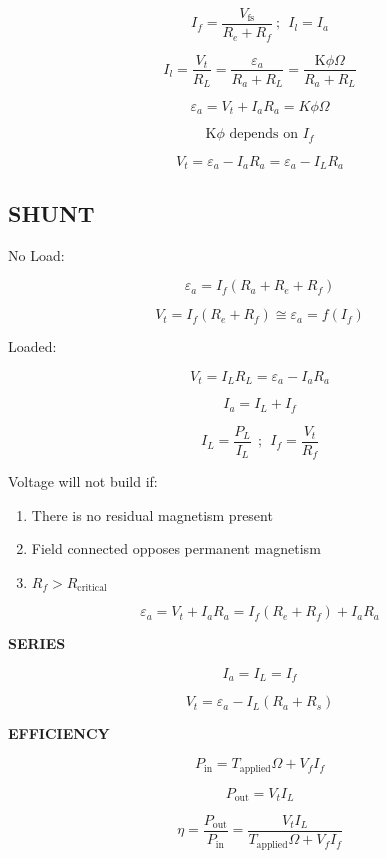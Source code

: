 \begin{multicols}{2}
	\[I_{f} = \frac{V_{\text{fs}}}{R_{e} + R_{f}}\ ;\ \ I_{l} = I_{a}\]
	
	\[I_{l} = \frac{V_{t}}{R_{L}} = \frac{\varepsilon_{a}}{R_{a} + R_{L}} = \frac{\text{K}\phi\Omega}{R_{a} + R_{L}}\]
	
	\[\varepsilon_{a} = V_{t} + I_{a}R_{a} = K\phi\Omega\]
	
	\[\text{K} \phi \text{ depends\ on\ }I_{f}\]
	
	\[V_{t} = \varepsilon_{a} - I_{a}R_{a} = \varepsilon_{a} - I_{L}R_{a}\]
	
	\subsection{SHUNT}
	
	No Load:
	
	\[\varepsilon_{a} = I_{f}(R_{a} + R_{e} + R_{f})\]
	
	\[V_{t} = I_{f}\left( R_{e} + R_{f} \right) \cong \varepsilon_{a} = f(I_{f})\]
	
	Loaded:
	
	\[V_{t} = I_{L}R_{L} = \varepsilon_{a} - I_{a}R_{a}\]
	
	\[I_{a} = I_{L} + I_{f}\]
	
	\[I_{L} = \frac{P_{L}}{I_{L}}\ \ ;\ \ I_{f} = \frac{V_{t}}{R_{f}}\]
	
	Voltage will not build if:
	
	\begin{enumerate}
		\def\labelenumi{\arabic{enumi}.}
		\item
		There is no residual magnetism present
		\item
		Field connected opposes permanent magnetism
		\item
		\(R_{f} > R_{\text{criti}\text{cal}}\)
	\end{enumerate}
	
	\[\varepsilon_{a} = V_{t} + I_{a}R_{a} = I_{f}\left( R_{e} + R_{f} \right) + I_{a}R_{a}\]
	
	\textbf{SERIES}
	
	\[I_{a} = I_{L} = I_{f}\]
	
	\[V_{t} = \varepsilon_{a} - I_{L}(R_{a} + R_{s})\]
	
	\textbf{EFFICIENCY}
	
	\[P_{\text{in}} = T_{\text{applied}}\Omega + V_{f}I_{f}\]
	
	\[P_{\text{out}} = V_{t}I_{L}\]
	
	\[\eta = \frac{P_{\text{out}}}{P_{\text{in}}} = \frac{V_{t}I_{L}}{T_{\text{applied}}\Omega + V_{f}I_{f}}\]
	

\end{multicols}
